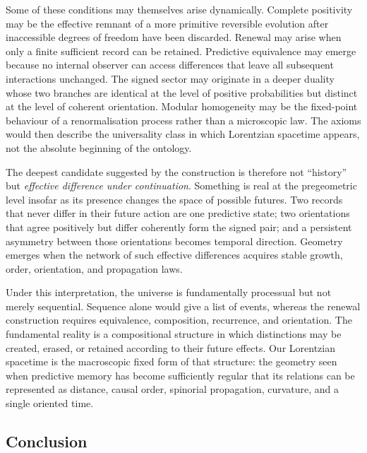 \documentclass[11pt]{article}
\theoremstyle{definition}
\theoremstyle{remark}
\begin{document}
Some of these conditions may themselves arise dynamically.  Complete
positivity may be the effective remnant of a more primitive reversible
evolution after inaccessible degrees of freedom have been discarded.
Renewal may arise when only a finite sufficient record can be retained.
Predictive equivalence may emerge because no internal observer can access
differences that leave all subsequent interactions unchanged.  The signed
sector may originate in a deeper duality whose two branches are identical at
the level of positive probabilities but distinct at the level of coherent
orientation.  Modular homogeneity may be the fixed-point behaviour of a
renormalisation process rather than a microscopic law.  The axioms would then
describe the universality class in which Lorentzian spacetime appears, not the
absolute beginning of the ontology.

The deepest candidate suggested by the construction is therefore not
``history'' but \emph{effective difference under continuation}.  Something is
real at the pregeometric level insofar as its presence changes the space of
possible futures.  Two records that never differ in their future action are
one predictive state; two orientations that agree positively but differ
coherently form the signed pair; and a persistent asymmetry between those
orientations becomes temporal direction.  Geometry emerges when the network
of such effective differences acquires stable growth, order, orientation, and
propagation laws.

Under this interpretation, the universe is fundamentally processual but not
merely sequential.  Sequence alone would give a list of events, whereas the
renewal construction requires equivalence, composition, recurrence, and
orientation.  The fundamental reality is a compositional structure in which
distinctions may be created, erased, or retained according to their future
effects.  Our Lorentzian spacetime is the macroscopic fixed form of that
structure: the geometry seen when predictive memory has become sufficiently
regular that its relations can be represented as distance, causal order,
spinorial propagation, curvature, and a single oriented time.





\subsection{Conclusion}
\label{sec:conclusion}
\label{subsec:scope}
\label{subsec:limitations}
\end{document}

